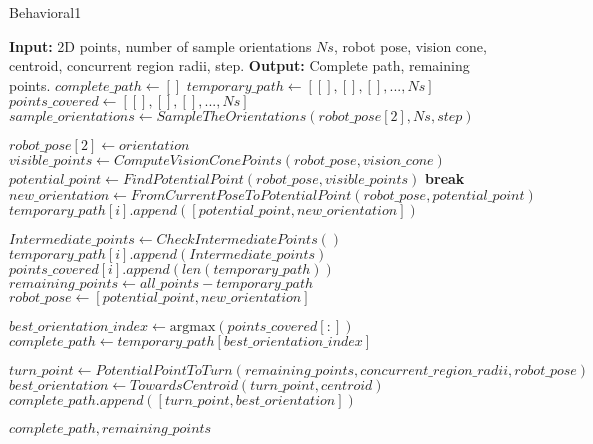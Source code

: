 \begin{algorithm}[H]
    \caption{Behavioral1}
    \begin{algorithmic}[1]
        \Statex \textbf{Input:} 2D points, number of sample orientations $Ns$, robot pose, vision cone, centroid, concurrent region radii, step.
        \Statex \textbf{Output:} Complete path, remaining points.
        \newline
        \State $complete\_path \gets []$
        \State $temporary\_path \gets [[], [], [], ..., Ns]$
        \State $points\_covered \gets [[], [], [], ..., Ns]$
        \State $sample\_orientations \gets SampleTheOrientations(robot\_pose[2], Ns, step)$
        
            \State $robot\_pose[2] \gets orientation$
                \State $visible\_points \gets ComputeVisionConePoints(robot\_pose, vision\_cone)$
                \State $potential\_point \gets FindPotentialPoint(robot\_pose, visible\_points)$
                \State \textbf{break}
                \EndIf
                \State $new\_orientation \gets FromCurrentPoseToPotentialPoint(robot\_pose, potential\_point)$
                \State $temporary\_path[i].append([potential\_point, new\_orientation])$

                \State $Intermediate\_points \gets CheckIntermediatePoints()$
                \State $temporary\_path[i].append(Intermediate\_points)$
                \State $points\_covered[i].append(len(temporary\_path))$
                \State $remaining\_points \gets all\_points - temporary\_path$
                \State $robot\_pose \gets [potential\_point, new\_orientation]$
            \EndWhile
        \EndFor
        
        \State $best\_orientation\_index \gets \text{argmax}(points\_covered[:])$
        \State $complete\_path \gets temporary\_path[best\_orientation\_index]$
        
        \State $turn\_point \gets PotentialPointToTurn(remaining\_points, concurrent\_region\_radii, robot\_pose)$
        \State $best\_orientation \gets TowardsCentroid(turn\_point, centroid)$
        \State $complete\_path.append([turn\_point, best\_orientation])$
        
        \State \Return $complete\_path, remaining\_points$
    \end{algorithmic}
\end{algorithm}


